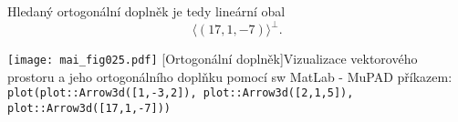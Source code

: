 \begin{example}
  Hledaný ortogonální doplněk je tedy lineární obal $$\langle(17, 1, -7)\rangle^\bot.$$
  
    {\centering
     \captionsetup{type=figure}
    \texttt{[image: mai\_fig025.pdf]}
    [Ortogonální doplněk]{Vizualizace vektorového prostoru a jeho    
             ortogonálního doplňku pomocí sw MatLab - MuPAD příkazem:\newline
             \texttt{plot(plot::Arrow3d([1,-3,2]), plot::Arrow3d([2,1,5]), 
             plot::Arrow3d([17,1,-7]))}}
    \label{LA:fig_ort01}
    \par}
\end{example}
